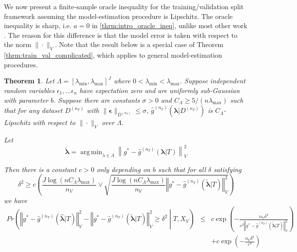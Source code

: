 \documentclass[12pt]{article}
\newtheorem{theorem}{Theorem}
\DeclareMathOperator*{\argmin}{arg\,min}
\begin{document}
We now present a finite-sample oracle inequality for the training/validation split framework assuming the model-estimation procedure is Lipschitz. The oracle inequality is sharp, i.e. $a=0$ in \eqref{thrm:intro_oracle_ineq}, unlike most other work \citep{gyorfi2006distribution, lecue2012oracle, van2003unified}. The reason for this difference is that the model error is taken with respect to the norm $\| \cdot \|_V$. Note that the result below is a special case of Theorem \ref{thrm:train_val_complicated}, which applies to general model-estimation procedures. 
\begin{theorem}
\label{thrm:train_val}
Let $\Lambda=[\lambda_{\min},\lambda_{\max}]^{J}$ where $0 < \lambda_{\min} < \lambda_{\max}$. Suppose independent random variables $\epsilon_1, ... \epsilon_n$ have expectation zero and are uniformly sub-Gaussian with parameter $b$. Suppose there are constants $\sigma > 0$ and $C_\Lambda \ge 5/(n \lambda_{\max})$ such that for any dataset $D^{(n_T)}$ with $\|\boldsymbol{\epsilon}\|_{D^{(n_T)}} \le \sigma$, $\hat g^{(n_T)}(\boldsymbol{\lambda} |D^{(n_T)})$ is $C_\Lambda$-Lipschitz with respect to $\| \cdot \|_V$ over $\Lambda$.

Let 
\begin{equation}
\tilde{\boldsymbol \lambda} = \argmin_{\lambda \in \Lambda} \left \| g^*-\hat{g}^{(n_T)}( \boldsymbol{\lambda} | T) \right \|_{V}^{2}
\end{equation}

Then there is a constant $c>0$ only depending on $b$ such that for all $\delta$ satisfying
\begin{equation}
\delta^{2}
\ge
c \left ( 
\frac{J\log (n C_\Lambda\lambda_{\max})}{n_{V}}
\vee 
\sqrt{\frac{J \log (n C_\Lambda \lambda_{\max})}{n_{V}}\left\Vert g^* - \hat{g}^{(n_T)}( \tilde{\boldsymbol{\lambda}} | T)\right\Vert_{V}^2}
\right )
\label{thrm:train_val_delta}
\end{equation}
we have
\begin{eqnarray*}
	Pr\left(
	\left\Vert g^* - \hat{g}^{(n_T)}( \hat{\boldsymbol{\lambda}} | T) \right\Vert _{V}^2 -
	\left\Vert g^* - \hat{g}^{(n_T)}( \tilde{\boldsymbol{\lambda}} | T) \right\Vert _{V}^2
	\ge\delta^2
	\middle | 
	T, X_V
	\right )
	&\le& c\exp\left(-\frac{n_{V}\delta^{4}}{
		c^{2}
		\left\Vert g^* - \hat{g}^{(n_T)}( \tilde{\boldsymbol{\lambda}} | T) \right\Vert _{V}^2
	}\right) \\
	&& +c\exp\left(-\frac{n_{V}\delta^{2}}{c^{2}}\right) \\
\end{eqnarray*}

\end{theorem}
\end{document}
